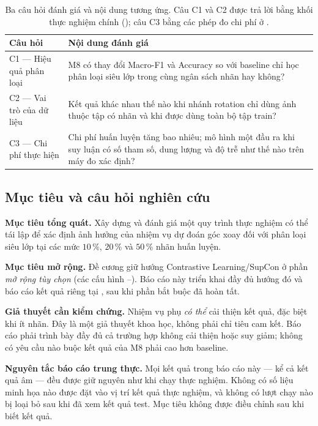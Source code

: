 \begin{table}[htbp]
  \centering
  \small
  \begin{tabular}{@{}p{4.6cm} p{10.4cm}@{}}
    \toprule
    Câu hỏi & Nội dung đánh giá \\
    \midrule
    C1 --- Hiệu quả phân loại &
    M8 có thay đổi Macro-F1 và Accuracy so với baseline chỉ học phân loại siêu lớp trong cùng
    ngân sách nhãn hay không? \\
    \addlinespace
    C2 --- Vai trò của dữ liệu &
    Kết quả khác nhau thế nào khi nhánh rotation chỉ dùng ảnh thuộc tập có nhãn và khi được
    dùng toàn bộ tập train? \\
    \addlinespace
    C3 --- Chi phí thực hiện &
    Chi phí huấn luyện tăng bao nhiêu; mô hình một đầu ra khi suy luận có số tham số, dung
    lượng và độ trễ như thế nào trên máy đo xác định? \\
    \bottomrule
  \end{tabular}
  \caption{Ba câu hỏi đánh giá và nội dung tương ứng. Câu C1 và C2 được trả lời bằng khối
  thực nghiệm chính (); câu C3 bằng các phép đo chi phí ở
  .}
  \label{tab:questions}
\end{table}

\subsection{Mục tiêu và câu hỏi nghiên cứu}
\label{sec:intro-goal}

\textbf{Mục tiêu tổng quát.} Xây dựng và đánh giá một quy trình thực nghiệm có thể tái lập để
xác định ảnh hưởng của nhiệm vụ dự đoán góc xoay đối với phân loại siêu lớp tại các mức
$10\,\%$, $20\,\%$ và $50\,\%$ nhãn huấn luyện.

\textbf{Mục tiêu mở rộng.} Đề cương giữ hướng Contrastive Learning/SupCon ở phần \emph{mở rộng
tùy chọn} (các cấu hình --). Báo cáo này triển khai đầy đủ hướng đó và báo cáo
kết quả riêng tại , sau khi phần bắt buộc đã hoàn tất.

\textbf{Giả thuyết cần kiểm chứng.} Nhiệm vụ phụ \emph{có thể} cải thiện kết quả, đặc biệt khi
ít nhãn. Đây là một giả thuyết khoa học, không phải chỉ tiêu cam kết. Báo cáo phải trình bày
đầy đủ cả trường hợp không cải thiện hoặc suy giảm; không có yêu cầu nào buộc kết quả của M8
phải cao hơn baseline.

\begin{warnbox}
\textbf{Nguyên tắc báo cáo trung thực.} Mọi kết quả trong báo cáo này — kể cả kết quả âm —
đều được giữ nguyên như khi chạy thực nghiệm. Không có số liệu minh họa nào được đặt vào vị
trí kết quả thực nghiệm, và không có lượt chạy nào bị loại bỏ sau khi đã xem kết quả test.
Mục tiêu không được điều chỉnh sau khi biết kết quả.
\end{warnbox}

